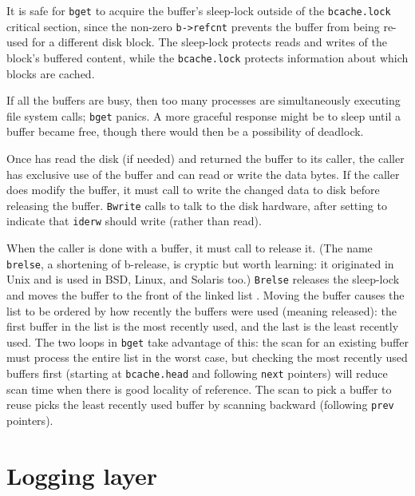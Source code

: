 It is safe for
\lstinline{bget}
to acquire the buffer's sleep-lock outside of the 
\lstinline{bcache.lock}
critical section,
since the non-zero
\lstinline{b->refcnt}
prevents the buffer from being re-used for a different disk block.
The sleep-lock protects reads
and writes of the block's buffered content, while the
\lstinline{bcache.lock}
protects information about which blocks are cached.

If all the buffers are busy, then too many processes are
simultaneously executing file system calls;
\lstinline{bget}
panics.
A more graceful response might be to sleep until a buffer became free,
though there would then be a possibility of deadlock.

Once
has read the disk (if needed) and returned the
buffer to its caller, the caller has
exclusive use of the buffer and can read or write the data bytes.
If the caller does modify the buffer, it must call
to write the changed data to disk before releasing the buffer.
\lstinline{Bwrite}
calls
to talk to the disk hardware, after setting
to indicate that
\lstinline{iderw}
should write (rather than read).

When the caller is done with a buffer,
it must call
to release it. 
(The name
\lstinline{brelse},
a shortening of
b-release,
is cryptic but worth learning:
it originated in Unix and is used in BSD, Linux, and Solaris too.)
\lstinline{Brelse}
releases the sleep-lock and
moves the buffer
to the front of the linked list
.
Moving the buffer causes the
list to be ordered by how recently the buffers were used (meaning released):
the first buffer in the list is the most recently used,
and the last is the least recently used.
The two loops in
\lstinline{bget}
take advantage of this:
the scan for an existing buffer must process the entire list
in the worst case, but checking the most recently used buffers
first (starting at
\lstinline{bcache.head}
and following
\lstinline{next}
pointers) will reduce scan time when there is good locality of reference.
The scan to pick a buffer to reuse picks the least recently used
buffer by scanning backward
(following 
\lstinline{prev}
pointers).
\section{Logging layer}

